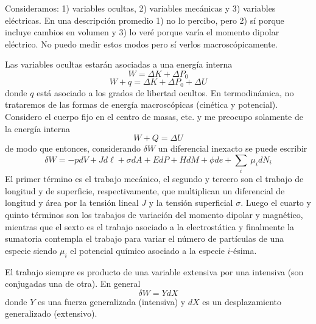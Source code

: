 \documentclass[10pt,oneside]{CBFT_book}
\begin{document}
Consideramos: 1) variables ocultas, 2) variables mecánicas y 3) variables eléctricas.
En una descripción promedio 1) no lo percibo, pero 2) sí porque incluye cambios en volumen y 3) lo veré
porque varía el momento dipolar eléctrico.
No puedo medir estos modos pero sí verlos macroscópicamente.

Las variables ocultas estarán asociadas a una energía interna
\[
	W = \Delta K + \Delta P_0
\]
\[
	W + q = \Delta K + \Delta P_0 + \Delta U
\]
donde $q$ está asociado a los grados de libertad ocultos. En termodinámica, no trataremos de las formas de 
energía macroscópicas (cinética y potencial). Considero el cuerpo fijo en el centro de masas, etc. y me
preocupo solamente de la energía interna
\[
	W + Q = \Delta U
\]
de modo que entonces, considerando $\delta W$ un diferencial inexacto se puede escribir
\[
	\delta W = - p dV + J d\ell + \sigma dA + E dP
	+ H dM + \phi de + \sum_{i} \: \mu_i dN_i
\]
El primer término es el trabajo mecánico, el segundo y tercero son el trabajo de longitud y de superficie,
respectivamente, que multiplican un diferencial de longitud y área por la tensión lineal $J$ y la tensión
superficial $\sigma$. Luego el cuarto y quinto términos son los trabajos de variación del momento dipolar
y magnético, mientras que el sexto es el trabajo asociado a la electrostática y finalmente la sumatoria
contempla el trabajo para variar el número de partículas de una especie siendo $\mu_i$ el potencial químico
asociado a la especie $i$-ésima.

El trabajo siempre es producto de una variable extensiva por una intensiva (son conjugadas una de otra).
En general
\[
	\delta W = Y dX
\]
donde $Y$ es una fuerza generalizada (intensiva) y $dX$ es un desplazamiento generalizado (extensivo).
\end{document}
